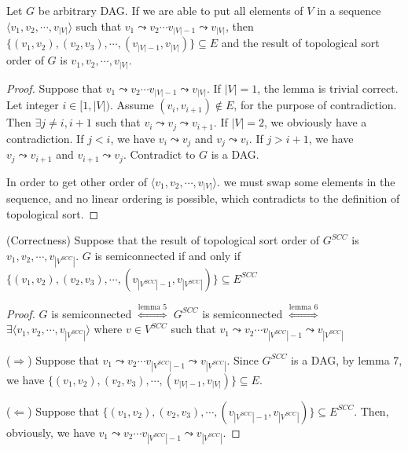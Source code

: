 \begin{lemma}
    Let $G$ be arbitrary DAG.
    If we are able to put all elements of $V$ in a sequence 
    $\langle v_1, v_2, \cdots, v_{|V|} \rangle$ such that 
    $v_1 \leadsto v_2 \cdots v_{|V|-1} \leadsto v_{|V|}$,
    then $\{ (v_1,v_2), (v_2,v_3), \cdots, (v_{|V|-1}, v_{|V|}) \} \subseteq E$ and
    the result of topological sort order of $G$ is
    $v_1, v_2, \cdots, v_{|V|}$.
\end{lemma}

\begin{proof}
    Suppose that $v_1 \leadsto v_2 \cdots v_{|V|-1} \leadsto v_{|V|}$.
    If $|V|=1$, the lemma is trivial correct.
    Let integer $i \in [1,|V|)$.
    Assume $(v_i, v_{i+1}) \notin E$, for the purpose of contradiction.
    Then $\exists j \neq i, i+1$ such that 
    $v_i \leadsto v_j \leadsto v_{i+1}$.
    If $|V|=2$, we obviously have a contradiction.
    If $j < i$, we have 
    $v_i \leadsto v_j$ and $v_j \leadsto v_i$.
    If $j > i+1$, we have 
    $v_j \leadsto v_{i+1}$ and $v_{i+1} \leadsto v_j$.
    Contradict to $G$ is a DAG.
    
    In order to get other order of $\langle v_1, v_2, \cdots, v_{|V|} \rangle$.
    we must swap some elements in the sequence, and no linear ordering is possible,
    which contradicts to the definition of topological sort.
\end{proof}

\begin{theorem}{(Correctness)}
    Suppose that the result of topological sort order of $G^{SCC}$ is
    $v_1, v_2, \cdots, v_{|V^{SCC}|}$.
    $G$ is semiconnected if and only if 
    $\{ (v_1,v_2), (v_2,v_3), \cdots, (v_{|V^{SCC}|-1}, v_{|V^{SCC}|}) \} \subseteq E^{SCC}$
\end{theorem}

\begin{proof}
    $G$ is semiconnected
    $\overset{\text{lemma 5}}{\Longleftrightarrow}$
    $G^{SCC}$ is semiconnected
    $\overset{\text{lemma 6}}{\Longleftrightarrow}$\\
    $\exists \langle v_1, v_2, \cdots, v_{|V^{SCC}|} \rangle$ where $v \in V^{SCC}$ such that 
    $v_1 \leadsto v_2 \cdots v_{|V^{SCC}|-1} \leadsto v_{|V^{SCC}|}$

    ($\Longrightarrow$)
    Suppose that $v_1 \leadsto v_2 \cdots v_{|V^{SCC}|-1} \leadsto v_{|V^{SCC}|}$.
    Since $G^{SCC}$ is a DAG,
    by lemma 7, we have $\{ (v_1,v_2), (v_2,v_3), \cdots, (v_{|V|-1}, v_{|V|}) \} \subseteq E$.

    ($\Longleftarrow$)
    Suppose that $\{ (v_1,v_2), (v_2,v_3), \cdots, (v_{|V^{SCC}|-1}, v_{|V^{SCC}|}) \} \subseteq E^{SCC}$.
    Then, obviously, we have $v_1 \leadsto v_2 \cdots v_{|V^{SCC}|-1} \leadsto v_{|V^{SCC}|}$.
\end{proof}

